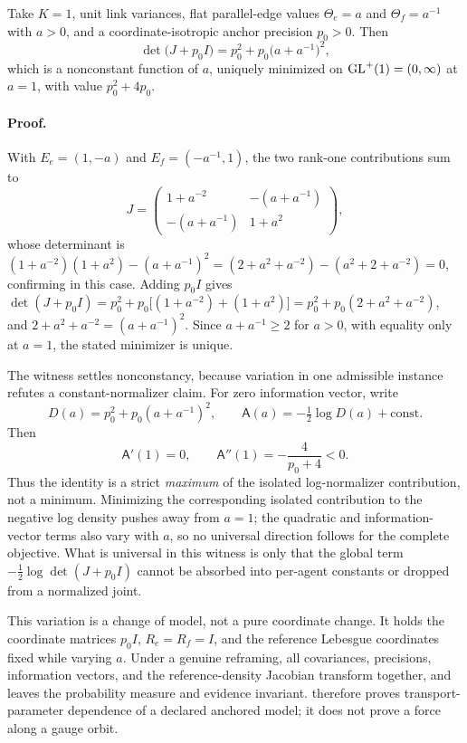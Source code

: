 Take \(K=1\), unit link variances, flat parallel-edge values
\(\Theta_e=a\) and \(\Theta_f=a^{-1}\) with \(a>0\), and a
coordinate-isotropic anchor precision $p_0>0$. Then
\begin{equation}
\det\bigl(J+p_0I\bigr)=p_0^{2}+p_0\bigl(a+a^{-1}\bigr)^{2},
\label{eq:obs-det-witness}
\end{equation}
which is a nonconstant function of $a$, uniquely minimized on \(\mathrm{GL}^+(1)=(0,\infty)\) at $a=1$, with value $p_0^{2}+4p_0$.

\paragraph{Proof.}
With \(E_e=(1,-a)\) and \(E_f=(-a^{-1},1)\), the two rank-one contributions sum to
\[
J=\begin{pmatrix}1+a^{-2}&-(a+a^{-1})\\[2pt]-(a+a^{-1})&1+a^{2}\end{pmatrix},
\]
whose determinant is $(1+a^{-2})(1+a^{2})-(a+a^{-1})^{2}=(2+a^{2}+a^{-2})-(a^{2}+2+a^{-2})=0$, confirming  in this case. Adding $p_0I$ gives
$\det(J+p_0I)=p_0^{2}+p_0\bigl[(1+a^{-2})+(1+a^{2})\bigr]=p_0^{2}+p_0(2+a^{2}+a^{-2})$,
and $2+a^{2}+a^{-2}=(a+a^{-1})^{2}$. Since \(a+a^{-1}\geq2\) for \(a>0\), with equality only at \(a=1\), the stated minimizer is unique.

The witness settles nonconstancy, because variation in one admissible instance refutes a constant-normalizer claim. For zero information vector, write
\[
D(a)=p_0^2+p_0(a+a^{-1})^2,
\qquad
\mathsf A(a)=-\tfrac12\log D(a)+\mathrm{const}.
\]
Then
\begin{equation}
\mathsf A'(1)=0,
\qquad
\mathsf A''(1)=-\frac{4}{p_0+4}<0.
\label{eq:obs-normalizer-curvature}
\end{equation}
Thus the identity is a strict \emph{maximum} of the isolated log-normalizer contribution, not a minimum. Minimizing the corresponding isolated contribution to the negative log density pushes away from \(a=1\); the quadratic and information-vector terms also vary with \(a\), so no universal direction follows for the complete objective. What is universal in this witness is only that the global term \(-\tfrac12\log\det(J+p_0I)\) cannot be absorbed into per-agent constants or dropped from a normalized joint. 

This variation is a change of model, not a pure coordinate change. It holds the coordinate matrices \(p_0I\), \(R_e=R_f=I\), and the reference Lebesgue coordinates fixed while varying \(a\). Under a genuine reframing, all covariances, precisions, information vectors, and the reference-density Jacobian transform together, and  leaves the probability measure and evidence invariant.  therefore proves transport-parameter dependence of a declared anchored model; it does not prove a force along a gauge orbit. 

